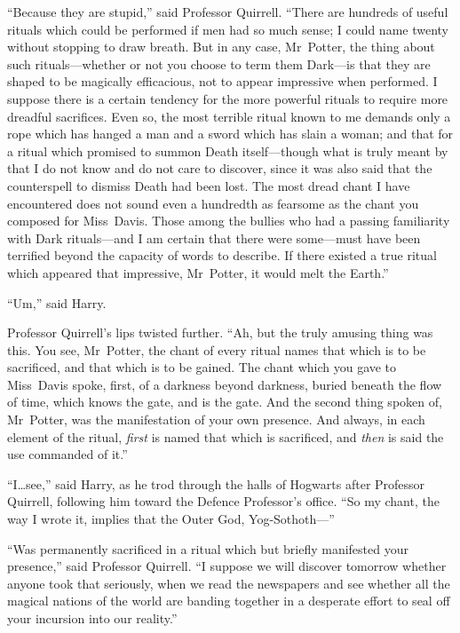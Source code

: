“Because they are stupid,” said Professor Quirrell. “There are hundreds of useful rituals which could be performed if men had so much sense; I could name twenty without stopping to draw breath. But in any case, Mr~Potter, the thing about such rituals—whether or not you choose to term them Dark—is that they are shaped to be magically efficacious, not to appear impressive when performed. I suppose there is a certain tendency for the more powerful rituals to require more dreadful sacrifices. Even so, the most terrible ritual known to me demands only a rope which has hanged a man and a sword which has slain a woman; and that for a ritual which promised to summon Death itself—though what is truly meant by that I do not know and do not care to discover, since it was also said that the counterspell to dismiss Death had been lost. The most dread chant I have encountered does not sound even a hundredth as fearsome as the chant you composed for Miss~Davis. Those among the bullies who had a passing familiarity with Dark rituals—and I am certain that there were some—must have been terrified beyond the capacity of words to describe. If there existed a true ritual which appeared that impressive, Mr~Potter, it would melt the Earth.”

“Um,” said Harry.

Professor Quirrell’s lips twisted further. “Ah, but the truly amusing thing was this. You see, Mr~Potter, the chant of every ritual names that which is to be sacrificed, and that which is to be gained. The chant which you gave to Miss~Davis spoke, first, of a darkness beyond darkness, buried beneath the flow of time, which knows the gate, and is the gate. And the second thing spoken of, Mr~Potter, was the manifestation of your own presence. And always, in each element of the ritual, \emph{first} is named that which is sacrificed, and \emph{then} is said the use commanded of it.”

“I…see,” said Harry, as he trod through the halls of Hogwarts after Professor Quirrell, following him toward the Defence Professor’s office. “So my chant, the way I wrote it, implies that the Outer God, Yog-Sothoth—”

“Was permanently sacrificed in a ritual which but briefly manifested your presence,” said Professor Quirrell. “I suppose we will discover tomorrow whether anyone took that seriously, when we read the newspapers and see whether all the magical nations of the world are banding together in a desperate effort to seal off your incursion into our reality.”

